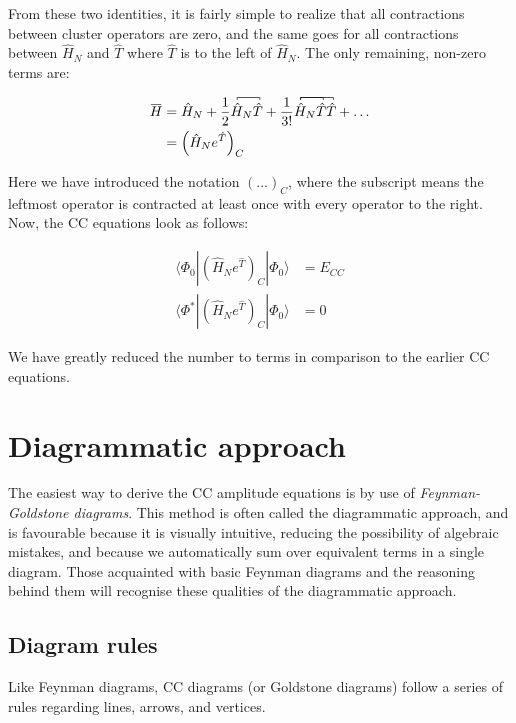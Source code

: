 \documentclass[10pt]{report}
\begin{document}
	From these two identities, it is fairly simple to realize that all contractions between cluster operators are zero, and the same goes for all contractions between $\hat{H}_N$ and $\hat{T}$ where $\hat{T}$ is to the left of $\hat{H}_N$. The only remaining, non-zero terms are:
	
	\begin{align}
		\begin{split}
		\overbar{H} &= \hat{H}_N + \frac{1}{2} \contraction[2pt]{}{\hat{H}}{{}_N}{\hat{T}}\hat{H}_N\hat{T} + \frac{1}{3!}\contraction[2pt]{}{\hat{H}}{{}_N}{\hat{T}}
		\contraction[2pt]{}{\hat{H}}{{}_N\hat{T}}{\hat{T}}\hat{H}_N\hat{T}\hat{T} + \ldots \\
		&= \left(\hat{H}_Ne^{\hat{T}}\right)_C
		\end{split}
	\end{align}
	
	Here we have introduced the notation $(\ldots)_C$, where the subscript means the leftmost operator is contracted at least once with every operator to the right.\\
	Now, the CC equations look as follows:
	
	\begin{align}
	\langle\Phi_0|\left(\hat{H}_Ne^{\hat{T}}\right)_C|\Phi_0\rangle &= E_{CC}\\
	\langle\Phi^*|\left(\hat{H}_Ne^{\hat{T}}\right)_C|\Phi_0\rangle &= 0
	\end{align}
	
	We have greatly reduced the number to terms in comparison to the earlier CC equations.
	
	\section{Diagrammatic approach}
	The easiest way to derive the CC amplitude equations is by use of \emph{Feynman-Goldstone diagrams}. This method is often called the diagrammatic approach, and is favourable because it is visually intuitive, reducing the possibility of algebraic mistakes, and because we automatically sum over equivalent terms in a single diagram. Those acquainted with basic Feynman diagrams and the reasoning behind them will recognise these qualities of the diagrammatic approach.
	
	\subsection{Diagram rules}
	Like Feynman diagrams, CC diagrams (or Goldstone diagrams) follow a series of rules regarding lines, arrows, and vertices. 
	
\end{document}
